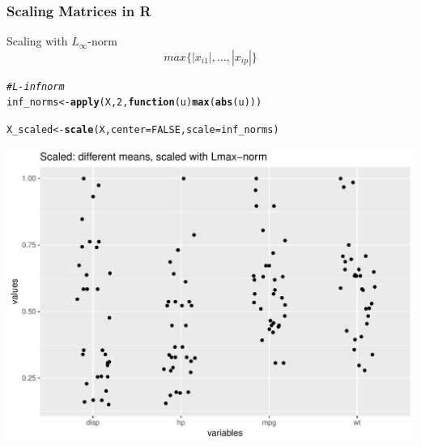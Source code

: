 \documentclass[12pt]{beamer}\usepackage[]{graphicx}\usepackage[]{color}
\makeatletter
\def\maxwidth{ %
  \ifdim\Gin@nat@width>\linewidth
    \linewidth
  \else
    \Gin@nat@width
  \fi
}
\newcommand{\hlnum}[1]{\textcolor[rgb]{0.686,0.059,0.569}{#1}}%
\newcommand{\hlcom}[1]{\textcolor[rgb]{0.678,0.584,0.686}{\textit{#1}}}%
\newcommand{\hlstd}[1]{\textcolor[rgb]{0.345,0.345,0.345}{#1}}%
\newcommand{\hlkwa}[1]{\textcolor[rgb]{0.161,0.373,0.58}{\textbf{#1}}}%
\newcommand{\hlkwb}[1]{\textcolor[rgb]{0.69,0.353,0.396}{#1}}%
\newcommand{\hlkwc}[1]{\textcolor[rgb]{0.333,0.667,0.333}{#1}}%
\newcommand{\hlkwd}[1]{\textcolor[rgb]{0.737,0.353,0.396}{\textbf{#1}}}%
\newenvironment{kframe}{%
 \def\at@end@of@kframe{}%
 \ifinner\ifhmode%
  \def\at@end@of@kframe{\end{minipage}}%
  \begin{minipage}{\columnwidth}%
 \fi\fi%
 \def\FrameCommand##1{\hskip\@totalleftmargin \hskip-\fboxsep
 \colorbox{shadecolor}{##1}\hskip-\fboxsep
     \hskip-\linewidth \hskip-\@totalleftmargin \hskip\columnwidth}%
 \MakeFramed {\advance\hsize-\width
   \@totalleftmargin\z@ \linewidth\hsize
   \@setminipage}}%
 {\par\unskip\endMakeFramed%
 \at@end@of@kframe}
\newenvironment{knitrout}{}{} %
\makeatother
\begin{document}

\begin{frame}[fragile]
\frametitle{Scaling Matrices in R}

Scaling with $L_{\infty}$-norm
$$
max \{ |x_{i1}|, \dots, |x_{ip}| \}
$$

\begin{knitrout}\footnotesize
{}\color{fgcolor}\begin{kframe}
\begin{alltt}
\hlcom{# L-inf norm}
\hlstd{inf_norms} \hlkwb{<-} \hlkwd{apply}\hlstd{(X,} \hlnum{2}\hlstd{,} \hlkwa{function}\hlstd{(}\hlkwc{u}\hlstd{)} \hlkwd{max}\hlstd{(}\hlkwd{abs}\hlstd{(u)))}

\hlstd{X_scaled} \hlkwb{<-} \hlkwd{scale}\hlstd{(X,} \hlkwc{center} \hlstd{=} \hlnum{FALSE}\hlstd{,} \hlkwc{scale} \hlstd{= inf_norms)}
\end{alltt}
\end{kframe}
\end{knitrout}

\end{frame}


\begin{frame}[fragile]



\begin{knitrout}\footnotesize
{}\color{fgcolor}

{\centering \includegraphics[width=\maxwidth]{figure/unnamed-chunk-21-1} 

}



\end{knitrout}

\end{frame}
\end{document}

